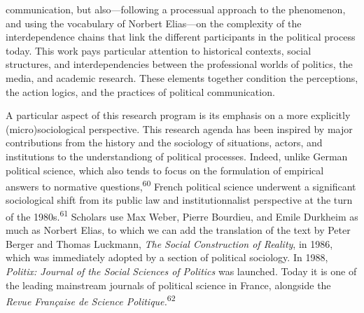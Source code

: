 \documentclass{tufte-handout}
\begin{document}
communication, but also---following a processual approach to the
phenomenon, and using the vocabulary of Norbert Elias---on the
complexity of the interdependence chains that link the different
participants in the political process today. This work pays particular
attention to historical contexts, social structures, and
interdependencies between the professional worlds of politics, the
media, and academic research. These elements together condition the
perceptions, the action logics, and the practices of political
communication.

A particular aspect of this research program is its emphasis on a more
explicitly (micro)sociological perspective. This research agenda has
been inspired by major contributions from the history and the sociology
of situations, actors, and institutions to the understandiong of
political processes. Indeed, unlike German political science, which also
tends to focus on the formulation of empirical answers to normative
questions,\textsuperscript{60} French political science underwent a
significant sociological shift from its public law and institutionnalist
perspective at the turn of the 1980s.\textsuperscript{61} Scholars use Max Weber,
Pierre Bourdieu, and Emile Durkheim as much as Norbert Elias, to which
we can add the translation of the text by Peter Berger and Thomas
Luckmann, \emph{The Social Construction of Reality}, in 1986, which was
immediately adopted by a section of political sociology. In 1988,
\emph{Politix: Journal of the Social Sciences of Politics} was launched.
Today it is one of the leading mainstream journals of political science
in France, alongside the \emph{Revue Française de Science
Politique.}\textsuperscript{62}
\end{document}
